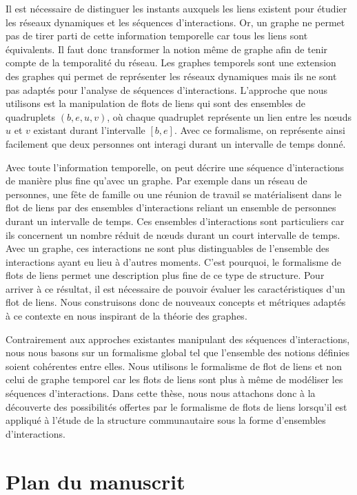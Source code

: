 Il est nécessaire de distinguer les instants auxquels les liens existent pour étudier les réseaux dynamiques et les séquences d'interactions.
Or, un graphe ne permet pas de tirer parti de cette information temporelle car tous les liens sont équivalents. 
Il faut donc transformer la notion même de graphe afin de tenir compte de la temporalité du réseau.
Les graphes temporels sont une extension des graphes qui permet de représenter les réseaux dynamiques mais ils ne sont pas adaptés pour l'analyse de séquences d'interactions.
L'approche que nous utilisons est la manipulation de flots de liens qui sont des ensembles de quadruplets $(b, e, u, v)$, où chaque quadruplet représente un lien entre les n\oe uds $u$ et $v$ existant durant l'intervalle $[b,e]$.
Avec ce formalisme, on représente ainsi facilement que deux personnes ont interagi durant un intervalle de temps donné.


Avec toute l'information temporelle, on peut décrire une séquence d'interactions de manière plus fine qu'avec un graphe.
Par exemple dans un réseau de personnes, une fête de famille ou une réunion de travail se matérialisent dans le flot de liens par des ensembles d'interactions reliant un ensemble de personnes durant un intervalle de temps.
Ces ensembles d'interactions sont particuliers car ils concernent un nombre réduit de n\oe uds durant un court intervalle de temps.
Avec un graphe, ces interactions ne sont plus distinguables de l'ensemble des interactions ayant eu lieu à d'autres moments.
C'est pourquoi, le formalisme de flots de liens permet une description plus fine de ce type de structure.
Pour arriver à ce résultat, il est nécessaire de pouvoir évaluer les caractéristiques d'un flot de liens.
Nous construisons donc de nouveaux concepts et métriques adaptés à ce contexte en nous inspirant de la théorie des graphes.


\bigskip


Contrairement aux approches existantes manipulant des séquences d'interactions, nous nous basons sur un formalisme global tel que l'ensemble des notions définies soient cohérentes entre elles.
Nous utilisons le formalisme de flot de liens et non celui de graphe temporel car les flots de liens sont plus à même de modéliser les séquences d'interactions.
Dans cette thèse, nous nous attachons donc à la découverte des possibilités offertes par le formalisme de flots de liens lorsqu'il est appliqué à l'étude de la structure communautaire sous la forme d'ensembles d'interactions.

\section*{Plan du manuscrit}


